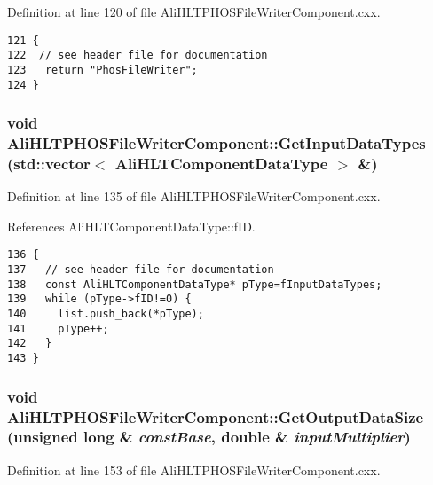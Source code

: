 Definition at line 120 of file Ali\-HLTPHOSFile\-Writer\-Component.cxx.

\footnotesize\begin{verbatim}121 {
122  // see header file for documentation
123   return "PhosFileWriter";
124 }
\end{verbatim}\normalsize 


\subsubsection{\setlength{\rightskip}{0pt plus 5cm}void Ali\-HLTPHOSFile\-Writer\-Component::Get\-Input\-Data\-Types (std::vector$<$ {\bf Ali\-HLTComponent\-Data\-Type} $>$ \&)\hspace{0.3cm}{\tt  [virtual]}}\label{classAliHLTPHOSFileWriterComponent_a6}




Definition at line 135 of file Ali\-HLTPHOSFile\-Writer\-Component.cxx.

References Ali\-HLTComponent\-Data\-Type::f\-ID.

\footnotesize\begin{verbatim}136 {
137   // see header file for documentation
138   const AliHLTComponentDataType* pType=fInputDataTypes;
139   while (pType->fID!=0) {
140     list.push_back(*pType);
141     pType++;
142   }
143 }
\end{verbatim}\normalsize 


\subsubsection{\setlength{\rightskip}{0pt plus 5cm}void Ali\-HLTPHOSFile\-Writer\-Component::Get\-Output\-Data\-Size (unsigned long \& {\em const\-Base}, double \& {\em input\-Multiplier})\hspace{0.3cm}{\tt  [virtual]}}\label{classAliHLTPHOSFileWriterComponent_a8}




Definition at line 153 of file Ali\-HLTPHOSFile\-Writer\-Component.cxx.

